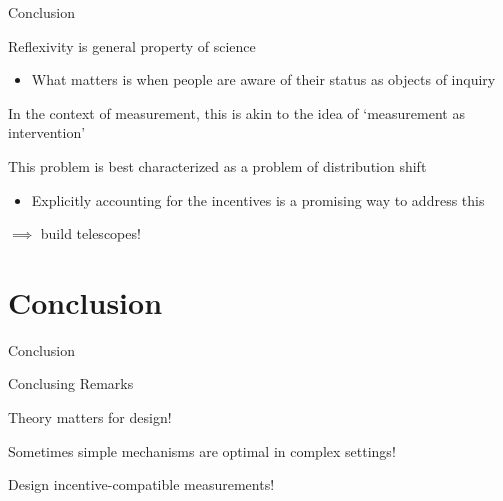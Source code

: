 \documentclass[aspectratio=169,xcolor=dvipsnames]{beamer}
\begin{document}
\begin{frame}{Conclusion}

Reflexivity is general property of science
\begin{itemize}
    \item What matters is when people are aware of their status as objects of inquiry
\end{itemize}

\vspace{5mm}
In the context of measurement, this is akin to the idea of `measurement as intervention' \autocite{morgan2001}

\vspace{5mm}
This problem is best characterized as a problem of distribution shift
\begin{itemize}
    \item Explicitly accounting for the incentives is a promising way to address this \autocite{luce95}
\end{itemize}

\vspace{5mm}
{\color{red}$\implies$ build telescopes!}

\end{frame}






\section{Conclusion}

\begin{frame}

    \vspace{10mm}
    {\Large{\centerline{Conclusion}}}

\end{frame}

\begin{frame}{Conclusing Remarks}

Theory matters for design!

\vspace{5mm}
Sometimes simple mechanisms are optimal in complex settings!

\vspace{5mm}
Design incentive-compatible measurements!

\end{frame}
\end{document}
